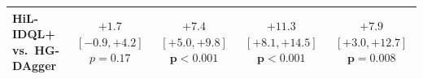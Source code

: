 \begin{tabular}{lcccc}
\shortstack[l]{HiL-IDQL+\ours{}\\vs.\ HG-DAgger} & \shortstack{$+1.7$ $[-0.9, +4.2]$\\$p = 0.17$} & \shortstack{$+7.4$ $[+5.0, +9.8]$\\$\mathbf{p < 0.001}$} & \shortstack{$+11.3$ $[+8.1, +14.5]$\\$\mathbf{p < 0.001}$} & \shortstack{$+7.9$ $[+3.0, +12.7]$\\$\mathbf{p = 0.008}$} \\
\hline
\end{tabular}

